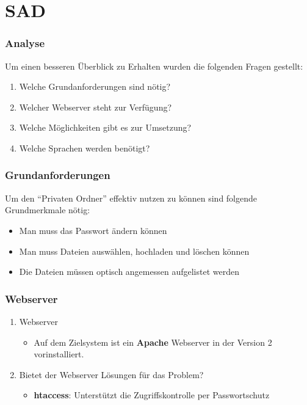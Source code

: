 \section{SAD}
\begin{frame} %
  \frametitle{Analyse} %

  Um einen besseren Überblick zu Erhalten wurden die folgenden Fragen gestellt:
  \bigskip
  \begin{enumerate}
   \item Welche Grundanforderungen sind nötig?
   \item Welcher Webserver steht zur Verfügung?
   \item Welche Möglichkeiten gibt es zur Umsetzung?
   \item Welche Sprachen werden benötigt?
  \end{enumerate}

\end{frame}

\begin{frame} %
  \frametitle{Grundanforderungen} %

   Um den "`Privaten Ordner"' effektiv nutzen zu können sind folgende Grundmerkmale nötig:
   \bigskip
   \begin{itemize}
    \item Man muss das Passwort ändern können
    \item Man muss Dateien auswählen, hochladen und löschen können
    \item Die Dateien müssen optisch angemessen aufgelistet werden
   \end{itemize}

\end{frame}

\begin{frame} %
  \frametitle{Webserver} %
  \begin{enumerate}
   \item Webserver
   \begin{itemize}
    \item Auf dem Zielsystem ist ein \textbf{Apache} Webserver in der Version 2 vorinstalliert.
   \end{itemize}
   \bigskip
   \item Bietet der Webserver Lösungen für das Problem?
   \begin{itemize}
    \item \textbf{htaccess}: Unterstützt die Zugriffskontrolle per Passwortschutz
   \end{itemize}

  \end{enumerate}


\end{frame}

